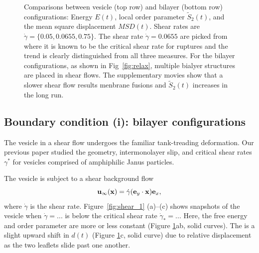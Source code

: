 \documentclass[aps,prl,preprint,groupedaddress]{revtex4-2}
\newcommand{\xx}{\mathbf{x}}
\newcommand{\uu}{\mathbf{u}}
\begin{document}
\begin{figure}
\begin{center}
  \end{center}
  \caption{
    \label{fig:BC1_shear}
    Comparisons between vesicle (top row) and bilayer (bottom row) configurations: Energy $E(t)$, local order parameter $\tilde{S}_2(t)$, and the mean square displacement $MSD(t)$. Shear rates are $\dot\gamma=\{0.05, 0.0655, 0.75\}$. The shear rate $\dot\gamma = 0.0655$ are picked from ~\cite{Fu2022_JFM} where it is known to be the critical shear rate for ruptures and the trend is clearly distinguished from all three measures. For the bilayer configurations, as shown in Fig~\ref{fig:relax}, multiple bialyer structures are placed in shear flows. The supplementary movies show that a slower shear flow results menbrane fusions and $\tilde{S}_2(t)$ increases in the long run.
     }
\end{figure}




\subsection{Boundary condition (i):   bilayer configurations}
The vesicle in a shear flow undergoes the familiar tank-treading deformation.
Our previous paper \cite{Fu2022_JFM} studied the geometry,
intermonolayer slip, and critical shear rates $\gamma^*$
for vesicles comprised of amphiphilic Janus particles. 

The vesicle is subject to a shear background flow
\begin{equation}
\uu_\infty(\xx) = \dot\gamma ({\bf e}_y\cdot\xx){\bf e}_x,
\end{equation}
%
where $\dot\gamma$ is the shear rate. Figure~\ref{fig:shear_1} (a)--(c)
shows snapshots of the vesicle when $\dot\gamma= ... $ is
below the critical shear rate $\dot \gamma_* = ...$
Here, the free energy and order parameter are more or less constant
(Figure \ref{fig:BC1_shear}ab, solid curves).  The is a slight upward shift
in $d(t)$ (Figure \ref{fig:BC1_shear}c, solid curve) due to relative
displacement as the two leaflets slide past one another.  

\end{document}
